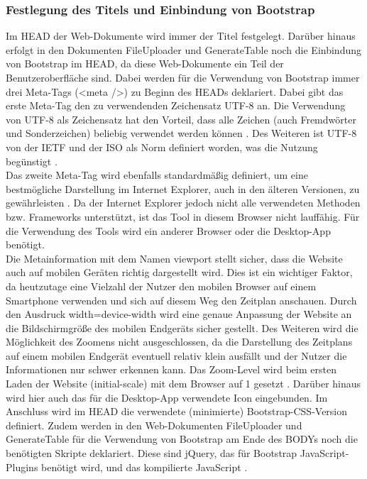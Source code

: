 \subsubsection{Festlegung des Titels und Einbindung von Bootstrap}
Im HEAD der Web-Dokumente wird immer der Titel festgelegt. 
Darüber hinaus erfolgt in den Dokumenten FileUploader und GenerateTable noch die Einbindung von Bootstrap im HEAD, da diese Web-Dokumente ein Teil der Benutzeroberfläche sind. 
Dabei werden für die Verwendung von Bootstrap immer drei Meta-Tags (<meta />) zu Beginn des HEADs deklariert. 
Dabei gibt das erste Meta-Tag den zu verwendenden Zeichensatz \ac{UTF-8} an. Die Verwendung von UTF-8 als Zeichensatz hat den Vorteil, dass alle Zeichen (auch Fremdwörter und Sonderzeichen) beliebig verwendet werden können \cite{kodierung}. Des Weiteren ist UTF-8 von der \ac{IETF} und der \ac{ISO} als Norm definiert worden, was die Nutzung begünstigt \cite{utf8}. \\
Das zweite Meta-Tag wird ebenfalls standardmäßig definiert, um eine bestmögliche Darstellung im Internet Explorer, auch in den älteren Versionen, zu gewährleisten \cite{meta}.  Da der Internet Explorer jedoch nicht alle verwendeten Methoden bzw. Frameworks unterstützt, ist das Tool in diesem Browser nicht lauffähig. Für die Verwendung des Tools wird ein anderer Browser oder die Desktop-App benötigt.\\
Die Metainformation mit dem Namen viewport stellt sicher, dass die Website auch auf mobilen Geräten richtig dargestellt wird. Dies ist ein wichtiger Faktor, da heutzutage eine Vielzahl der Nutzer den mobilen Browser auf einem Smartphone verwenden und sich auf diesem Weg den Zeitplan anschauen. Durch den Ausdruck width=device-width wird eine genaue Anpassung der Website an die Bildschirmgröße des mobilen Endgeräts sicher gestellt. Des Weiteren wird die Möglichkeit des Zoomens nicht ausgeschlossen, da die Darstellung des Zeitplans auf einem mobilen Endgerät eventuell relativ klein ausfällt und der Nutzer die Informationen nur schwer erkennen kann. Das Zoom-Level wird beim ersten Laden der Website (initial-scale) mit dem Browser auf 1 gesetzt \cite{meta3}. Darüber hinaus wird hier auch das für die Desktop-App verwendete Icon eingebunden.
Im Anschluss wird im HEAD die verwendete (minimierte) Bootstrap-CSS-Version definiert. 
Zudem werden in den Web-Dokumenten FileUploader und GenerateTable für die Verwendung von Bootstrap am Ende des BODYs noch die benötigten Skripte deklariert. Diese sind jQuery, das für Bootstrap JavaScript-Plugins benötigt wird, und das kompilierte JavaScript \cite{plugin}. 

